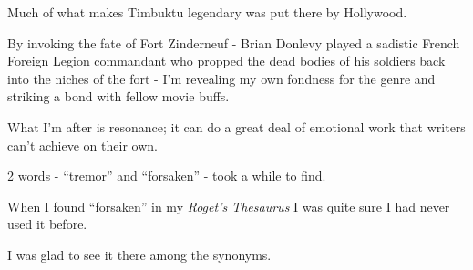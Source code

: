 \documentclass{book}
\numberwithin{equation}{section}
\begin{document}
Much of what makes Timbuktu legendary was put there by Hollywood.

By invoking the fate of Fort Zinderneuf - Brian Donlevy played a sadistic French Foreign Legion commandant who propped the dead bodies of his soldiers back into the niches of the fort - I'm revealing my own fondness for the genre and striking a bond with fellow movie buffs.

What I'm after is resonance; it can do a great deal of emotional work that writers can't achieve on their own.

%
2 words - ``tremor'' and ``forsaken'' - took a while to find.

When I found ``forsaken'' in my \textit{Roget's Thesaurus} I was quite sure I had never used it before.

I was glad to see it there among the synonyms.
\end{document}
